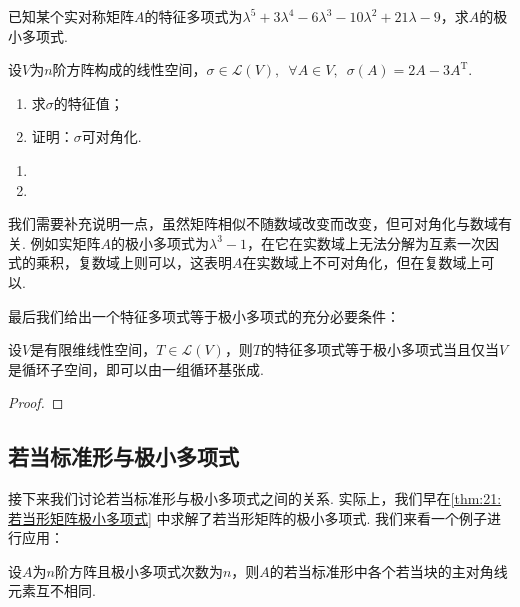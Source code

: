 \begin{example}
    已知某个实对称矩阵$A$的特征多项式为$\lambda^5+3\lambda^4-6\lambda^3-10\lambda^2+21\lambda-9$，求$A$的极小多项式.
\end{example}

\begin{solution}

\end{solution}

\begin{example}
    设$V$为$n$阶方阵构成的线性空间，$\sigma\in \mathcal{L}(V),\enspace \forall A\in V,\enspace \sigma(A)=2A-3A^{\mathrm{T}}$.
    \begin{enumerate}
        \item 求$\sigma$的特征值；

        \item 证明：$\sigma$可对角化.
    \end{enumerate}
\end{example}

\begin{solution}
    \begin{enumerate}
        \item

        \item
    \end{enumerate}
\end{solution}

我们需要补充说明一点，虽然矩阵相似不随数域改变而改变，但可对角化与数域有关. 例如实矩阵$A$的极小多项式为$\lambda^3-1$，在它在实数域上无法分解为互素一次因式的乘积，复数域上则可以，这表明$A$在实数域上不可对角化，但在复数域上可以.

最后我们给出一个特征多项式等于极小多项式的充分必要条件：
\begin{theorem} \label{thm:19:特征多项式等于极小多项式}
    设$V$是有限维线性空间，$T\in \mathcal{L}(V)$，则$T$的特征多项式等于极小多项式当且仅当$V$是循环子空间，即可以由一组循环基张成.
\end{theorem}
\begin{proof}

\end{proof}

\subsection{若当标准形与极小多项式}
接下来我们讨论若当标准形与极小多项式之间的关系. 实际上，我们早在\autoref{thm:21:若当形矩阵极小多项式} 中求解了若当形矩阵的极小多项式. 我们来看一个例子进行应用：
\begin{example}
    设$A$为$n$阶方阵且极小多项式次数为$n$，则$A$的若当标准形中各个若当块的主对角线元素互不相同.
\end{example}

